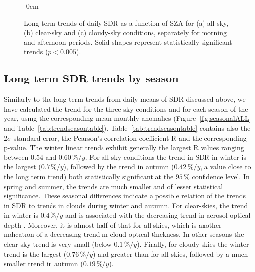 \documentclass[applsci,article,submit,moreauthors,pdftex]{Definitions/mdpi}
\begin{document}
\begin{figure}[h!]
    \begin{adjustwidth}{-\extralength}{0cm}
        {\centering 
            \hfill
            \hfill
        }
        \caption{Long term trends of daily SDR as a function of SZA for (a) all-sky, (b) clear-sky and (c) cloudy-sky conditions, separately for morning and afternoon periods. Solid shapes represent statistically significant trends ($p < 0.005$).}\label{fig:szatrends}
    \end{adjustwidth}
\end{figure}

\hypertarget{long-term-sdr-trends-by-season}{%
\subsection{Long term SDR trends by
season}\label{long-term-sdr-trends-by-season}}

Similarly to the long term trends from daily means of SDR discussed
above, we have calculated the trend for the three sky conditions and for
each season of the year, using the corresponding mean monthly anomalies
(Figure~\ref{fig:seasonalALL} and Table~\ref{tab:trendseasontable}).
Table~\ref{tab:trendseasontable} contains also the \(2\sigma\) standard
error, the Pearson's correlation coefficient R and the corresponding
p-value. The winter linear trends exhibit generally the largest R values
ranging between \(0.54\) and \(0.60\,\%/y\). For all-sky conditions the
trend in SDR in winter is the largest (\(0.7\,\%/y\)), followed by the
trend in autumn (\(0.42\,\%/y\), a value close to the long term trend)
both statistically significant at the \(95\,\%\) confidence level. In
spring and summer, the trends are much smaller and of lesser statistical
significance. These seasonal differences indicate a possible relation of
the trends in SDR to trends in clouds during winter and autumn. For
clear-skies, the trend in winter is \(0.4\,\%/y\) and is associated with
the decreasing trend in aerosol optical depth \citep{Siomos2020}.
Moreover, it is almost half of that for all-skies, which is another
indication of a decreasing trend in cloud optical thickness. In other
seasons the clear-sky trend is very small (below \(0.1\,\%/y\)).
Finally, for cloudy-skies the winter trend is the largest
(\(0.76\,\%/y\)) and greater than for all-skies, followed by a much
smaller trend in autumn (\(0.19\,\%/y\)).
\end{document}

